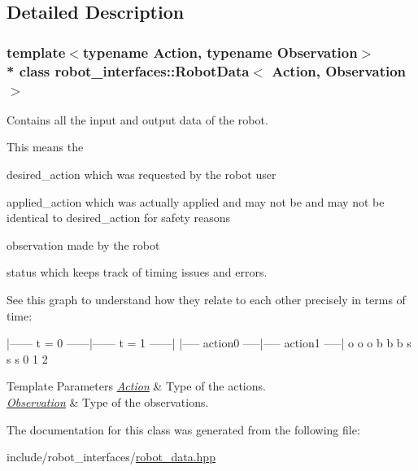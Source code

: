 \subsection{Detailed Description}
\subsubsection*{template$<$typename Action, typename Observation$>$\\*
class robot\+\_\+interfaces\+::\+Robot\+Data$<$ Action, Observation $>$}

Contains all the input and output data of the robot. 

This means the
\begin{DoxyItemize}
\item {\ttfamily desired\+\_\+action} which was requested by the robot user
\item {\ttfamily applied\+\_\+action} which was actually applied and may not be and may not be identical to desired\+\_\+action for safety reasons
\item {\ttfamily observation} made by the robot
\item {\ttfamily status} which keeps track of timing issues and errors.
\end{DoxyItemize}

See this graph to understand how they relate to each other precisely in terms of time\+:

\begin{DoxyVerb}|------ t = 0 ------|------ t = 1 ------|
|----- action0 -----|----- action1 -----|
o                   o                   o
b                   b                   b
s                   s                   s
0                   1                   2
\end{DoxyVerb}



\begin{DoxyTemplParams}{Template Parameters}
{\em \hyperlink{classAction}{Action}} & Type of the actions. \\
\hline
{\em \hyperlink{classObservation}{Observation}} & Type of the observations. \\
\hline
\end{DoxyTemplParams}


The documentation for this class was generated from the following file\+:\begin{DoxyCompactItemize}
\item 
include/robot\+\_\+interfaces/\hyperlink{robot__data_8hpp}{robot\+\_\+data.\+hpp}\end{DoxyCompactItemize}
